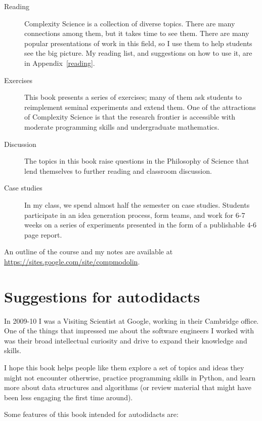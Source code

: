 \documentclass[10pt]{book}
\begin{document}
\begin{description}

\item[Reading] Complexity Science is a collection of diverse topics.
  There are many connections among them, but it takes time to see
  them.  There are many popular presentations of work in this field,
  so I use them to help students see the big picture.  My reading
  list, and suggestions on how to use it, are in
  Appendix~\ref{reading}.

\item[Exercises] This book presents a series of exercises; many of
  them ask students to reimplement seminal experiments and extend
  them.  One of the attractions of Complexity Science is that the
  research frontier is accessible with moderate programming skills and
  undergraduate mathematics.

\item[Discussion] The topics in this book raise questions in the
  Philosophy of Science that lend themselves to further reading and
  classroom discussion.

\item[Case studies] In my class, we spend almost half the semester on
  case studies.  Students participate in an idea generation process,
  form teams, and work for 6-7 weeks on a series of experiments
  presented in the form of a publishable 4-6 page report.

\end{description}

An outline of the course and my notes are available at
\url{https://sites.google.com/site/compmodolin}.

\section{Suggestions for autodidacts}

In 2009-10 I was a Visiting Scientist at Google, working in their
Cambridge office.  One of the things that impressed me about the
software engineers I worked with was their broad intellectual
curiosity and drive to expand their knowledge and skills.

I hope this book helps people like them explore a set of topics
and ideas they might not encounter otherwise, practice programming
skills in Python, and learn more about data structures and
algorithms (or review material that might have been less engaging
the first time around).

Some features of this book intended for autodidacts are:
\end{document}
